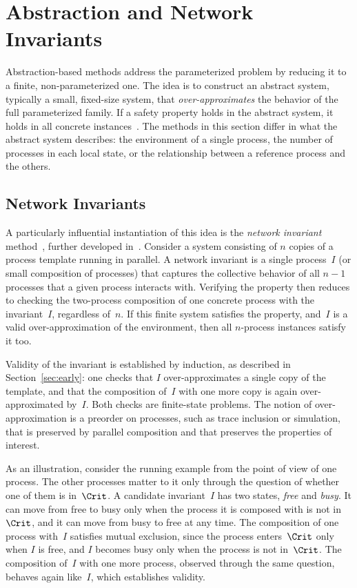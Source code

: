 \section{Abstraction and Network Invariants}
\label{sec:abstraction}

Abstraction-based methods address the parameterized problem by reducing it to a
finite, non-parameterized one. The idea is to construct an abstract system,
typically a small, fixed-size system, that \emph{over-approximates} the
behavior of the full parameterized family. If a safety property holds in the
abstract system, it holds in all concrete instances~\cite{WL89,PXZ02,ZP04}.
The methods in this section differ in what the abstract system describes: the
environment of a single process, the number of processes in each local state,
or the relationship between a reference process and the others.

\subsection{Network Invariants}

A particularly influential instantiation of this idea is the \emph{network
invariant} method~\cite{WL89,KM89}, further developed
in~\cite{KPSZ02,LHR97}. Consider a system consisting of $n$ copies of a
process template running in parallel. A network invariant is a single
process~$I$ (or small composition of processes) that captures the collective
behavior of all $n-1$ processes that a given process interacts with.
Verifying the property then reduces to checking the two-process composition
of one concrete process with the invariant~$I$, regardless of~$n$. If this
finite system satisfies the property, and~$I$ is a valid over-approximation of
the environment, then all $n$-process instances satisfy it too.

Validity of the invariant is established by induction, as described in
Section~\ref{sec:early}: one checks that $I$ over-approximates a single copy of
the template, and that the composition of~$I$ with one more copy is again
over-approximated by~$I$. Both checks are finite-state problems. The notion of
over-approximation is a preorder on processes, such as trace inclusion or
simulation, that is preserved by parallel composition and that preserves the
properties of interest.

As an illustration, consider the running example from the point of view of
one process. The other processes matter to it only through the question of
whether one of them is in~$\Crit$. A candidate invariant~$I$ has two states,
\emph{free} and \emph{busy}. It can move from free to busy only when the
process it is composed with is not in~$\Crit$, and it can move from busy to
free at any time. The composition of one process with~$I$ satisfies mutual
exclusion, since the process enters~$\Crit$ only when $I$ is free, and $I$
becomes busy only when the process is not in~$\Crit$. The composition of~$I$
with one more process, observed through the same question, behaves again
like~$I$, which establishes validity.

